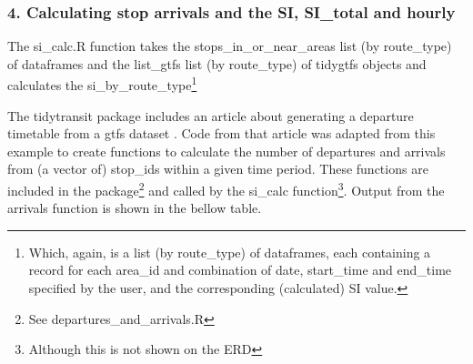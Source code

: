 \documentclass[preprint, 3p,
authoryear]{elsarticle} %
\newenvironment{Shaded}{\begin{snugshade}}{\end{snugshade}}
\newcommand{\AttributeTok}[1]{\textcolor[rgb]{0.13,0.29,0.53}{#1}}
\newcommand{\DecValTok}[1]{\textcolor[rgb]{0.00,0.00,0.81}{#1}}
\newcommand{\FunctionTok}[1]{\textcolor[rgb]{0.13,0.29,0.53}{\textbf{#1}}}
\newcommand{\NormalTok}[1]{#1}
\newcommand{\OtherTok}[1]{\textcolor[rgb]{0.56,0.35,0.01}{#1}}
\newcommand{\SpecialCharTok}[1]{\textcolor[rgb]{0.81,0.36,0.00}{\textbf{#1}}}
\newcommand{\StringTok}[1]{\textcolor[rgb]{0.31,0.60,0.02}{#1}}
\begin{document}
\hypertarget{calculating-stop-arrivals-and-the-si-si_total-and-hourly}{%
\subsubsection{4. Calculating stop arrivals and the SI, SI\_total and
hourly}\label{calculating-stop-arrivals-and-the-si-si_total-and-hourly}}

The si\_calc.R function takes the stops\_in\_or\_near\_areas list (by
route\_type) of dataframes and the list\_gtfs list (by route\_type) of
tidygtfs objects and calculates the si\_by\_route\_type\footnote{Which,
  again, is a list (by route\_type) of dataframes, each containing a
  record for each area\_id and combination of date, start\_time and
  end\_time specified by the user, and the corresponding (calculated) SI
  value.}

The tidytransit package includes an article about generating a departure
timetable from a gtfs dataset \citep{tidytransit_departure_timetable}.
Code from that article was adapted from this example to create functions
to calculate the number of departures and arrivals from (a vector of)
stop\_ids within a given time period. These functions are included in
the package\footnote{See departures\_and\_arrivals.R} and called by the
si\_calc function\footnote{Although this is not shown on the ERD}.
Output from the arrivals function is shown in the bellow table.

\begin{Shaded}
\end{Shaded}
\end{document}
